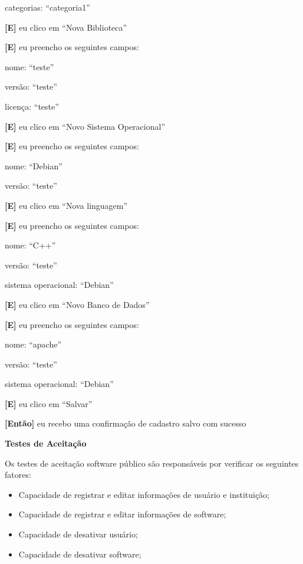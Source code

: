 \begin{itemize}
  		\subitem categorias: ``categoria1''
 	
 	\textbf{[E]} eu clico em ``Nova Biblioteca''

 	\textbf{[E]} eu preencho os seguintes campos: 

 		\subitem nome: ``teste''

 		\subitem versão: ``teste''

 		\subitem licença: ``teste''

 	\textbf{[E]} eu clico em ``Novo Sistema Operacional''

 	\textbf{[E]} eu preencho os seguintes campos: 

 		\subitem nome: ``Debian''

 		\subitem versão: ``teste''

 	\textbf{[E]} eu clico em ``Nova linguagem''

 	\textbf{[E]} eu preencho os seguintes campos: 

 		\subitem nome: ``C++''

 		\subitem versão: ``teste''

 		\subitem sistema operacional: ``Debian''

 	\textbf{[E]} eu clico em ``Novo Banco de Dados''

 	\textbf{[E]} eu preencho os seguintes campos: 

 		\subitem nome: ``apache''

 		\subitem versão: ``teste''

 		\subitem sistema operacional: ``Debian''

	\textbf{[E]} eu clico em ``Salvar''

	\textbf{[Então]} eu recebo uma confirmação de cadastro salvo com sucesso
	
	
\end{itemize}

\textbf{Testes de Aceitação}

Os testes de aceitação software público são responsáveis por verificar os seguintes fatores:

\begin{itemize}
	\item Capacidade de registrar e editar informações de usuário e instituição;
	\item Capacidade de registrar e editar informações de software;
	\item Capacidade de desativar usuário;
	\item Capacidade de desativar software;
\end{itemize}


